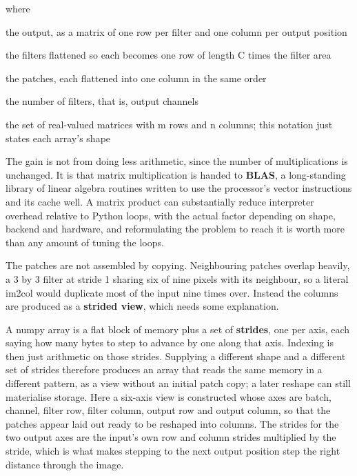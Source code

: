\noindent where
\begin{description}[leftmargin=2.4em,style=nextline,font=\normalfont\ttfamily]\setlength\itemsep{1pt}
  \item[{$Y$}] \normalfont the output, as a matrix of one row per filter and one column per output position
  \item[{$W_{\mathrm{flat}}$}] \normalfont the filters flattened so each becomes one row of length C times the filter area
  \item[{$X_{\mathrm{cols}}$}] \normalfont the patches, each flattened into one column in the same order
  \item[{$O$}] \normalfont the number of filters, that is, output channels
  \item[{$\mathbb{R}^{\,m \times n}$}] \normalfont the set of real-valued matrices with m rows and n columns; this notation just states each array's shape
\end{description}
The gain is not from doing less arithmetic, since the number of multiplications is unchanged. It is that matrix multiplication is handed to \textbf{BLAS}, a long-standing library of linear algebra routines written to use the processor's vector instructions and its cache well. A matrix product can substantially reduce interpreter overhead relative to Python loops, with the actual factor depending on shape, backend and hardware, and reformulating the problem to reach it is worth more than any amount of tuning the loops.


The patches are not assembled by copying. Neighbouring patches overlap heavily, a 3 by 3 filter at stride 1 sharing six of nine pixels with its neighbour, so a literal im2col would duplicate most of the input nine times over. Instead the columns are produced as a \textbf{strided view}, which needs some explanation.

A numpy array is a flat block of memory plus a set of \textbf{strides}, one per axis, each saying how many bytes to step to advance by one along that axis. Indexing is then just arithmetic on those strides. Supplying a different shape and a different set of strides therefore produces an array that reads the same memory in a different pattern, as a view without an initial patch copy; a later reshape can still materialise storage. Here a six-axis view is constructed whose axes are batch, channel, filter row, filter column, output row and output column, so that the patches appear laid out ready to be reshaped into columns. The strides for the two output axes are the input's own row and column strides multiplied by the stride, which is what makes stepping to the next output position step the right distance through the image.



